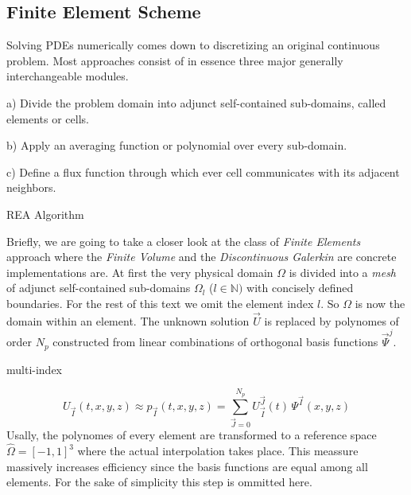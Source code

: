 \subsection{Finite Element Scheme}

Solving PDEs numerically comes down to discretizing an original continuous
problem. Most approaches consist of in essence three major generally
interchangeable modules.

a) Divide the problem domain into adjunct self-contained sub-domains, called
elements or cells.

b) Apply an averaging function or polynomial over every sub-domain.

c) Define a flux function through which ever cell communicates with its
adjacent neighbors.

REA Algorithm

Briefly, we are going to take a closer look at the class of \emph{Finite
Elements} approach where the \emph{Finite Volume} and the \emph{Discontinuous
Galerkin} are concrete implementations are. At first the very physical domain
$\Omega$ is divided into a \emph{mesh} of adjunct self-contained sub-domains
$\Omega_l$ ($l \in \mathbb{N})$ with concisely defined boundaries. For the rest
of this text we omit the element index $l$. So $\Omega$ is now the domain within
an element. The unknown solution $\vec{U}$ is replaced by polynomes of order $N_p$
constructed from linear combinations of orthogonal basis functions
$\vec{\Psi}^j$.

multi-index

\begin{equation}
    U_{\vec{I}}(t,x,y,z) \approx p_{\vec{I}}(t,x,y,z) = \sum^{N_p}_{\vec{J}=0} U^{\vec{J}}_{\vec{I}}(t) \, \Psi^{\vec{I}}(x,y,z)
\end{equation}
\remark Usally, the polynomes of every element are transformed to a reference
space $\hat{\Omega} = [-1,1]^3$ where the actual interpolation takes place. This
meassure massively increases efficiency since the basis functions are equal
among all elements. For the sake of simplicity this step is ommitted here.

